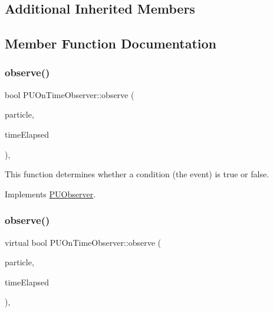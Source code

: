 \subsection*{Additional Inherited Members}


\subsection{Member Function Documentation}
\mbox{\label{classPUOnTimeObserver_a15ec72bea8accd66333cd9b50e9683da}} 
\subsubsection{\texorpdfstring{observe()}{observe()}\hspace{0.1cm}{\footnotesize\ttfamily [1/2]}}
{\footnotesize\ttfamily bool P\+U\+On\+Time\+Observer\+::observe (\begin{DoxyParamCaption}\item[{\hyperlink{structPUParticle3D}{P\+U\+Particle3D} $\ast$}]{particle,  }\item[{float}]{time\+Elapsed }\end{DoxyParamCaption})\hspace{0.3cm}{\ttfamily [override]}, {\ttfamily [virtual]}}

This function determines whether a condition (the event) is true or false. 

Implements \hyperlink{classPUObserver_a50f59cc3245e291b641463db5d3037f7}{P\+U\+Observer}.

\mbox{\label{classPUOnTimeObserver_ae8ec581632549ab8b8cd7e934c17a8b9}} 
\subsubsection{\texorpdfstring{observe()}{observe()}\hspace{0.1cm}{\footnotesize\ttfamily [2/2]}}
{\footnotesize\ttfamily virtual bool P\+U\+On\+Time\+Observer\+::observe (\begin{DoxyParamCaption}\item[{\hyperlink{structPUParticle3D}{P\+U\+Particle3D} $\ast$}]{particle,  }\item[{float}]{time\+Elapsed }\end{DoxyParamCaption})\hspace{0.3cm}{\ttfamily [override]}, {\ttfamily [virtual]}}

